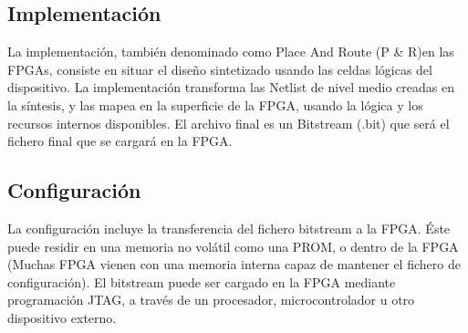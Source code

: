 \subsection{Implementación}
La implementación, también denominado como Place And Route (P \& R)en las FPGAs, consiste en situar el diseño sintetizado usando las celdas lógicas del dispositivo. La implementación transforma las Netlist de nivel medio creadas en la síntesis, y las mapea en la superficie de la FPGA, usando la lógica y los recursos internos disponibles. El archivo final es un Bitstream (.bit) que será el fichero final que se cargará en la FPGA.

\subsection{Configuración}
La configuración incluye la transferencia del fichero bitstream a la FPGA. Éste puede residir en una memoria no volátil como una PROM, o dentro de la FPGA (Muchas FPGA vienen con una memoria  interna capaz de mantener el fichero de configuración). El bitstream puede ser cargado en la FPGA mediante programación JTAG, a través de un procesador, microcontrolador u otro dispositivo externo.